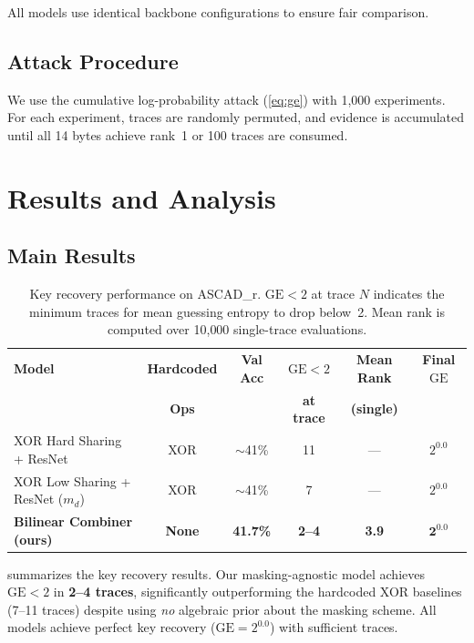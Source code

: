 \documentclass[submission]{iacrtrans}
\newcommand{\GE}{\mathrm{GE}}
\begin{document}
All models use identical backbone configurations to ensure fair comparison.

\subsection{Attack Procedure}

We use the cumulative log-probability attack (\cref{eq:ge}) with 1{,}000 experiments. For each experiment, traces are randomly permuted, and evidence is accumulated until all 14 bytes achieve rank~1 or 100 traces are consumed.


\section{Results and Analysis}\label{sec:results}

\subsection{Main Results}

\begin{table}[t]
  \centering
  \caption{Key recovery performance on ASCAD\_r. $\GE < 2$ at trace $N$ indicates the minimum traces for mean guessing entropy to drop below~2. Mean rank is computed over 10{,}000 single-trace evaluations.}
  \label{tab:main_results}
  \begin{tabular}{lccccc}
    \toprule
    \textbf{Model} & \textbf{Hardcoded} & \textbf{Val Acc} & \textbf{$\GE < 2$} & \textbf{Mean Rank} & \textbf{Final $\GE$} \\
    & \textbf{Ops} & & \textbf{at trace} & \textbf{(single)} & \\
    \midrule
    XOR Hard Sharing + ResNet & XOR & $\sim$41\% & 11 & --- & $2^{0.0}$ \\
    XOR Low Sharing + ResNet ($m_d$) & XOR & $\sim$41\% & 7 & --- & $2^{0.0}$ \\
    \midrule
    \textbf{Bilinear Combiner (ours)} & \textbf{None} & \textbf{41.7\%} & \textbf{2--4} & \textbf{3.9} & $\bm{2^{0.0}}$ \\
    \bottomrule
  \end{tabular}
\end{table}

 summarizes the key recovery results. Our masking-agnostic model achieves $\GE < 2$ in \textbf{2--4 traces}, significantly outperforming the hardcoded XOR baselines (7--11 traces) despite using \emph{no} algebraic prior about the masking scheme. All models achieve perfect key recovery ($\GE = 2^{0.0}$) with sufficient traces.
\end{document}
